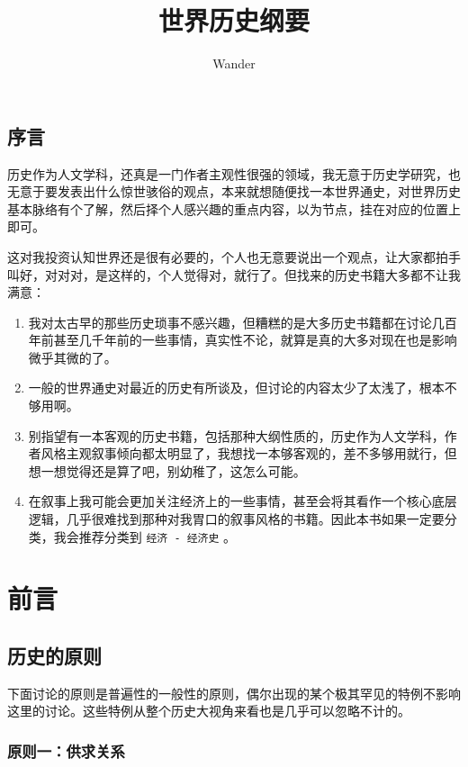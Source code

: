 \documentclass[12pt,oneside]{book}
\title{世界历史纲要}
\author{Wander}
\begin{document}
\makemytitle



\frontmatter 
{}
\chapter*{序言}
历史作为人文学科，还真是一门作者主观性很强的领域，我无意于历史学研究，也无意于要发表出什么惊世骇俗的观点，本来就想随便找一本世界通史，对世界历史基本脉络有个了解，然后择个人感兴趣的重点内容，以为节点，挂在对应的位置上即可。

这对我投资认知世界还是很有必要的，个人也无意要说出一个观点，让大家都拍手叫好，对对对，是这样的，个人觉得对，就行了。但找来的历史书籍大多都不让我满意：

\begin{enumerate}
\item 我对太古早的那些历史琐事不感兴趣，但糟糕的是大多历史书籍都在讨论几百年前甚至几千年前的一些事情，真实性不论，就算是真的大多对现在也是影响微乎其微的了。
\item 一般的世界通史对最近的历史有所谈及，但讨论的内容太少了太浅了，根本不够用啊。
\item 别指望有一本客观的历史书籍，包括那种大纲性质的，历史作为人文学科，作者风格主观叙事倾向都太明显了，我想找一本够客观的，差不多够用就行，但想一想觉得还是算了吧，别幼稚了，这怎么可能。
\item 在叙事上我可能会更加关注经济上的一些事情，甚至会将其看作一个核心底层逻辑，几乎很难找到那种对我胃口的叙事风格的书籍。因此本书如果一定要分类，我会推荐分类到 \verb+经济 - 经济史+ 。
\end{enumerate}





\setcounter{tocdepth}{2}    
\tableofcontents



\mainmatter

\part{前言}
\chapter{历史的原则}
下面讨论的原则是普遍性的一般性的原则，偶尔出现的某个极其罕见的特例不影响这里的讨论。这些特例从整个历史大视角来看也是几乎可以忽略不计的。


\section{原则一：供求关系}
\end{document}
